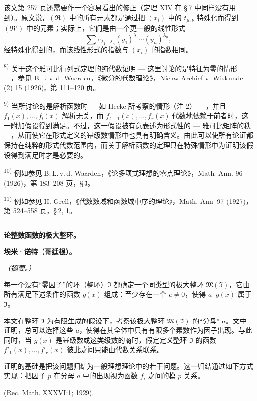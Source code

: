 {该文第 257 页还需要作一个容易看出的修正（定理 XIV 在 \S\,7 中同样没有用到）。原文说，$(\mathfrak{R})$ 中的所有元素都是通过把 $(x_i)$ 中的 $t_{\mu,\nu}$ 特殊化而得到 $(\mathfrak{R}')$ 中的元素；实际上，它们是由一个更一般的线性形式
\[
\sum s_{\lambda_1\ldots\lambda_n}(y_1)^{\lambda_1}\cdots(y_n)^{\lambda_n},
\]
经特殊化得到的，而该线性形式的指数与 $(x_i)$ 的指数相同。

\noindent\textsuperscript{8)} 关于这个雅可比行列式定理的纯代数证明 --- 这里讨论的是特征为零的情形 ---，参见 B.\,L.\,v.\,d. Waerden，《微分的代数理论》，Nieuw Archief v. Wiskunde (2) 15 (1926)，第 111--120 页。

\noindent\textsuperscript{9)} 当所讨论的是解析函数时 --- 如 Hecke 所考察的情形（注 2） ---，并且 $f_1(x),\ldots,f_t(x)$ 解析无关，而 $f_{t+1}(x),\ldots,f_r(x)$ 代数地依赖于前者时，这一附加假设得到满足。不过，这一假设被有意表述为形式性的 --- 雅可比矩阵的秩 ---，从而使它在形式定义的幂级数情形中也具有明确含义。由此可以使所有论证都保持在纯粹的形式代数范围内，而关于解析函数的定理只在特殊情形中为证明该假设得到满足时才是必要的。

\noindent\textsuperscript{10)} 例如参见 B.\,L.\,v.\,d. Waerden，《论多项式理想的零点理论》，Math. Ann. 96 (1926)，第 183--208 页，\S\,3。

\noindent\textsuperscript{11)} 例如参见 H. Grell，《代数数域和函数域中序的理论》，Math. Ann. 97 (1927)，第 524--558 页，\S\,2, 1。
}

\bigskip
\begin{center}\rule{4cm}{0.4pt}\end{center}
\begingroup
{}
\begin{center}
{\Large\bfseries 论整数函数的极大整环。}\par
\vspace{0.7em}
{\bfseries 埃米·诺特（哥廷根）。}\par
\vspace{0.5em}
\emph{（摘要。）}
\end{center}

每一个没有“零因子”的环（整环）$\mathfrak{I}$ 都确定一个同类型的极大整环 $\mathfrak{M}(\mathfrak{I})$，它由所有满足下述条件的函数 $g(x)$ 组成：至少存在一个 $a\ne0$，使得 $a\cdot g(x)$ 属于 $\mathfrak{I}$。

本文在整环 $\mathfrak{I}$ 为有限生成的假设下，考察该极大整环 $\mathfrak{M}(\mathfrak{I})$ 的“分母” $a$。文中证明，总可以选择这些 $a$，使得在其全体中只有有限多个素数作为因子出现。与此同时，当 $g(x)$ 是幂级数或这类级数的商时，假定定义整环 $\mathfrak{I}$ 的函数 $f'_1(x),\ldots,f'_r(x)$ 彼此之间只能由代数关系联系。

证明的基础是把该问题归结为一般理想理论中的若干问题。这一归结通过如下方式实现：把因子 $p$ 在分母 $a$ 中的出现视为函数 $f_i$ 之间的模 $p$ 关系。

\begin{center}
(Rec. Math. XXXVI:1; 1929).
\end{center}
\endgroup

\setcounter{footnote}{0}
\clearpage

